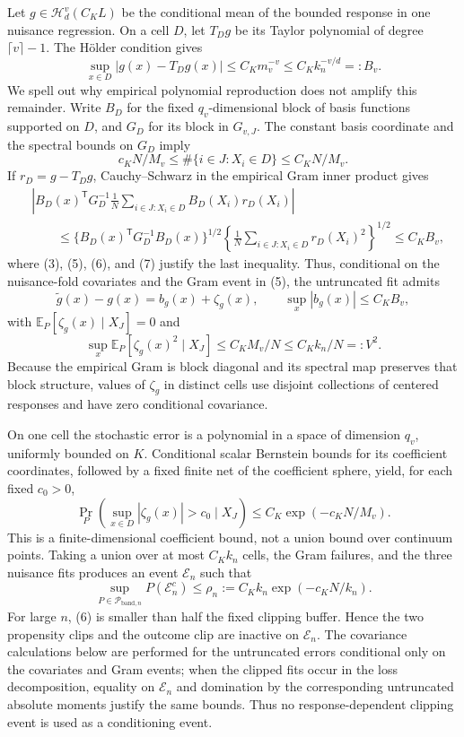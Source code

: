 Let \(g\in\mathcal H_d^v(C_KL)\) be the conditional mean of the bounded response in one nuisance regression.  On a cell \(D\), let \(T_Dg\) be its Taylor polynomial of degree \(\lceil v\rceil-1\).  The H\"older condition gives
\[
\sup_{x\in D}|g(x)-T_Dg(x)|\le C_Km_v^{-v}\le C_Kk_n^{-v/d}=:B_v.
\tag{6}
\]
We spell out why empirical polynomial reproduction does not amplify this remainder.  Write \(B_D\) for the fixed \(q_v\)-dimensional block of basis functions supported on \(D\), and \(G_D\) for its block in \(G_{v,J}\).  The constant basis coordinate and the spectral bounds on \(G_D\) imply
\[
c_KN/M_v\le \#\{i\in J:X_i\in D\}\le C_KN/M_v.
\tag{7}
\]
If \(r_D=g-T_Dg\), Cauchy--Schwarz in the empirical Gram inner product gives
\[
\begin{aligned}
&\left|B_D(x)^{\mathsf T}G_D^{-1}
\frac1N\sum_{i\in J:X_i\in D}B_D(X_i)r_D(X_i)\right|\\
&\qquad\le
\{B_D(x)^{\mathsf T}G_D^{-1}B_D(x)\}^{1/2}
\left\{\frac1N\sum_{i\in J:X_i\in D}r_D(X_i)^2\right\}^{1/2}
\le C_KB_v,
\end{aligned}
\tag{8}
\]
where (3), (5), (6), and (7) justify the last inequality.  Thus, conditional on the nuisance-fold covariates and the Gram event in (5), the untruncated fit admits
\[
\widetilde g(x)-g(x)=b_g(x)+\zeta_g(x),
\qquad
\sup_x|b_g(x)|\le C_KB_v,
\tag{9}
\]
with \(\mathbb E_P[\zeta_g(x)\mid X_J]=0\) and
\[
\sup_x\mathbb E_P[\zeta_g(x)^2\mid X_J]
\le C_KM_v/N\le C_Kk_n/N=:V^2.
\tag{10}
\]
Because the empirical Gram is block diagonal and its spectral map preserves that block structure, values of \(\zeta_g\) in distinct cells use disjoint collections of centered responses and have zero conditional covariance.

On one cell the stochastic error is a polynomial in a space of dimension \(q_v\), uniformly bounded on \(K\).  Conditional scalar Bernstein bounds for its coefficient coordinates, followed by a fixed finite net of the coefficient sphere, yield, for each fixed \(c_0>0\),
\[
\Pr_P\!\left(\sup_{x\in D}|\zeta_g(x)|>c_0\mid X_J\right)
\le C_K\exp(-c_KN/M_v).
\tag{11}
\]
This is a finite-dimensional coefficient bound, not a union bound over continuum points.  Taking a union over at most \(C_Kk_n\) cells, the Gram failures, and the three nuisance fits produces an event \(\mathcal E_n\) such that
\[
\sup_{P\in\mathcal P_{\mathrm{band},n}}P(\mathcal E_n^c)
\le \rho_n:=C_Kk_n\exp(-c_KN/k_n).
\tag{12}
\]
For large \(n\), (6) is smaller than half the fixed clipping buffer.  Hence the two propensity clips and the outcome clip are inactive on \(\mathcal E_n\).  The covariance calculations below are performed for the untruncated errors conditional only on the covariates and Gram events; when the clipped fits occur in the loss decomposition, equality on \(\mathcal E_n\) and domination by the corresponding untruncated absolute moments justify the same bounds.  Thus no response-dependent clipping event is used as a conditioning event.

